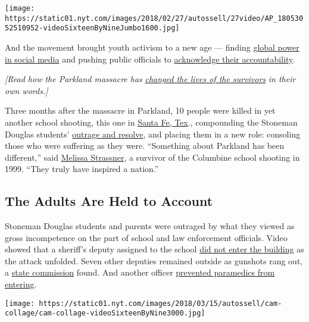 \texttt{[image: https://static01.nyt.com/images/2018/02/27/autossell/27video/AP\_18053052510952-videoSixteenByNineJumbo1600.jpg]}

And the movement brought youth activism to a new age --- finding
\href{https://www.nytimes.com/2018/03/07/us/parkland-students-social-media.html}{global
power in social media} and pushing public officials to
\href{https://www.nytimes.com/2018/02/22/arts/television/school-shooting-town-hall-cnn.html}{acknowledge
their accountability}.

\emph{{[}Read how the Parkland massacre has}
\href{https://www.nytimes.com/2019/02/13/us/parkland-anniversary-marjory-stoneman-douglas.html}{\emph{changed
the lives of the survivors}} \emph{in their own words.{]}}

Three months after the massacre in Parkland, 10 people were killed in
yet another school shooting, this one in
\href{https://www.nytimes.com/2018/05/24/us/santa-fe-shooting-students-parkland.html}{Santa
Fe, Tex}., compounding the Stoneman Douglas students'
\href{https://www.nytimes.com/2018/05/18/us/santa-fe-parkland-shooting.html}{outrage
and resolve}, and placing them in a new role: consoling those who were
suffering as they were. ``Something about Parkland has been different,''
said
\href{https://www.nytimes.com/2018/03/23/us/mass-shooting-survivors-march-lives-.html}{Melissa
Strassner}, a survivor of the Columbine school shooting in 1999. ``They
truly have inspired a nation.''

\hypertarget{the-adults-are-held-to-account}{%
\subsection{The Adults Are Held to
Account}\label{the-adults-are-held-to-account}}

Stoneman Douglas students and parents were outraged by what they viewed
as gross incompetence on the part of school and law enforcement
officials. Video showed that a sheriff's deputy assigned to the school
\href{https://www.nytimes.com/2018/02/22/us/nikolas-cruz-florida-shooting.html}{did
not enter the building} as the attack unfolded. Seven other deputies
remained outside as gunshots rang out, a
\href{https://www.nytimes.com/2018/12/12/us/parkland-shooting-florida-commission-report.html}{state
commission} found. And another officer
\href{https://www.nytimes.com/2018/06/01/us/parkland-shooting-paramedic-police-response.html}{prevented
paramedics from entering}.

\texttt{[image: https://static01.nyt.com/images/2018/03/15/autossell/cam-collage/cam-collage-videoSixteenByNine3000.jpg]}

